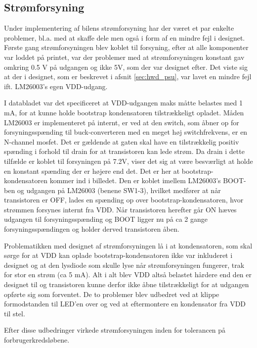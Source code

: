 \subsection{Strømforsyning}

Under implementering af bilens strømforsyning har der været et par enkelte problemer, bl.a. med at skaffe dele men også i form af en mindre fejl i designet.
Første gang strømforsyningen blev koblet til forsyning, efter at alle komponenter var loddet på printet, var der problemer med at strømforsyningen konstant gav omkring 0.5 V på udgangen og ikke 5V, som der var designet efter.
Det viste sig at der i designet, som er beskrevet i afsnit \ref{sec:hwd_psu}, var lavet en mindre fejl ift. LM26003's egen VDD-udgang.

I databladet var det specificeret at VDD-udgangen maks måtte belastes med 1 mA, for at kunne holde bootstrap kondensatoren tilstrækkeligt opladet.
Måden LM26003 er implementeret på internt, er ved at den switch, som åbner op for forsyningsspænding til buck-converteren med en meget høj switchfrekvens, er en N-channel mosfet.
Det er gældende at gaten skal have en tilstrækkelig positiv spænding i forhold til drain for at transistoren kan lede strøm. 
Da drain i dette tilfælde er koblet til forsyningen på 7.2V, viser det sig at være besværligt at holde en konstant spænding der er højere end det.
Det er her at bootstrap-kondensatoren kommer ind i billedet.
Den er koblet imellem LM26003's BOOT-ben og udgangen på LM26003 (benene SW1-3), hvilket medfører at når transistoren er OFF, lades en spænding op over bootstrap-kondensatoren, hvor strømmen forsynes internt fra VDD.
Når transistoren herefter går ON hæves udgangen til forsyningsspænding og BOOT ligger nu på ca 2 gange forsyningsspændingen og holder derved transistoren åben.

Problematikken med designet af strømforsyningen lå i at kondensatoren, som skal sørge for at VDD kan oplade bootstrap-kondensatoren ikke var inkluderet i designet og at den lysdiode som skulle lyse når strømforsyningen fungerer, trak for stor en strøm (ca 5 mA).
Alt i alt blev VDD altså belastet hårdere end den er designet til og transistoren kunne derfor ikke åbne tilstrækkeligt for at udgangen opførte sig som forventet.
De to problemer blev udbedret ved at klippe formodstanden til LED'en over og ved at eftermontere en kondensator fra VDD til stel.

Efter disse udbedringer virkede strømforsyningen inden for tolerancen på forbrugerkredsløbene. 

